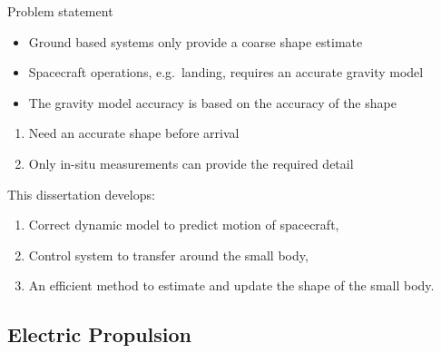 \begin{frame}[t]{Problem statement}
    \begin{itemize}
        \item Ground based systems only provide a coarse shape estimate
        \item Spacecraft operations, e.g.\ landing, requires an accurate gravity model
        \item The gravity model accuracy is based on the accuracy of the shape
    \end{itemize}

    \begin{block}{}
        \begin{center}
            \begin{enumerate}
                \item Need an accurate shape before arrival
                \item Only in-situ measurements can provide the required detail
            \end{enumerate}
        \end{center}
    \end{block}
    
    This dissertation develops:
    \begin{enumerate}
        \item Correct dynamic model to predict motion of spacecraft,
        \item Control system to transfer around the small body,
        \item An efficient method to estimate and update the shape of the small body.
    \end{enumerate}
\end{frame}

\subsection[Electric Propulsion]{Electric Propulsion}  

